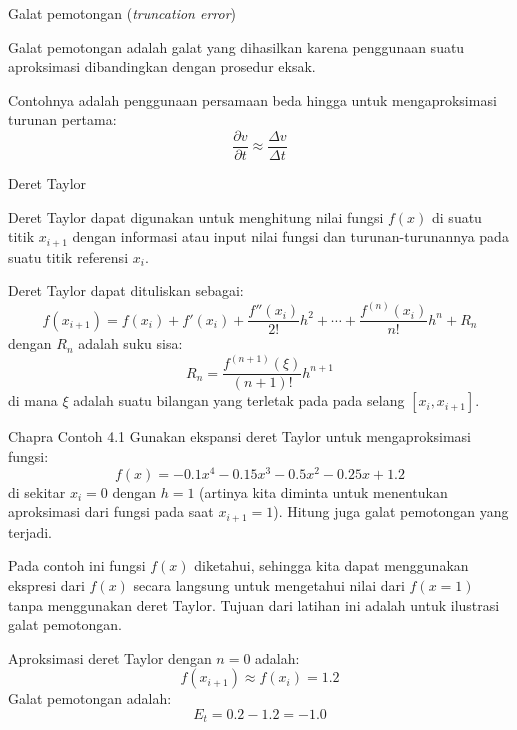 \begin{frame}{Galat pemotongan (\textit{truncation error})}

Galat pemotongan adalah galat yang dihasilkan karena penggunaan
suatu aproksimasi dibandingkan dengan prosedur eksak.

Contohnya adalah penggunaan persamaan beda hingga untuk mengaproksimasi
turunan pertama:
$$
\frac{\partial v}{\partial t} \approx \frac{\Delta v}{\Delta t}
$$

\end{frame}



\begin{frame}{Deret Taylor}

Deret Taylor dapat digunakan untuk menghitung nilai
fungsi $f(x)$ di suatu titik $x_{i+1}$ dengan informasi atau input
nilai fungsi dan turunan-turunannya pada suatu titik referensi $x_{i}$.

Deret Taylor dapat dituliskan sebagai:
\begin{equation}
f(x_{i+1}) = f(x_i) + f'(x_{i}) + \frac{f''(x_i)}{2!}h^2 + \cdots +
\frac{f^{(n)}(x_i)}{n!}h^n + R_{n}
\end{equation}
dengan $R_{n}$ adalah suku sisa:
\begin{equation}
R_{n} = \frac{f^{(n+1)}(\xi)}{(n+1)!}h^{n+1}
\end{equation}
di mana $\xi$ adalah suatu bilangan yang terletak pada pada selang
$[x_i, x_{i+1}]$.

\end{frame}


\begin{frame}

\fontsize{9}{10}\selectfont

\begin{block}{Chapra Contoh 4.1}
Gunakan ekspansi deret Taylor untuk mengaproksimasi fungsi:
$$
f(x) = -0.1 x^{4} - 0.15 x^{3} - 0.5 x^{2} - 0.25 x + 1.2
$$
di sekitar $x_{i} = 0$ dengan $h=1$ (artinya kita diminta untuk menentukan
aproksimasi dari fungsi pada saat $x_{i+1}=1$). Hitung juga galat pemotongan
yang terjadi.
\end{block}

Pada contoh ini fungsi $f(x)$ diketahui, sehingga kita dapat menggunakan
ekspresi dari $f(x)$ secara langsung untuk mengetahui nilai dari $f(x=1)$
tanpa menggunakan deret Taylor.
Tujuan dari latihan ini adalah untuk ilustrasi galat pemotongan.

Aproksimasi deret Taylor dengan $n=0$ adalah:
$$
f(x_{i+1}) \approx f(x_{i}) = 1.2
$$
Galat pemotongan adalah:
$$
E_{t} = 0.2 - 1.2 = -1.0
$$

\end{frame}



